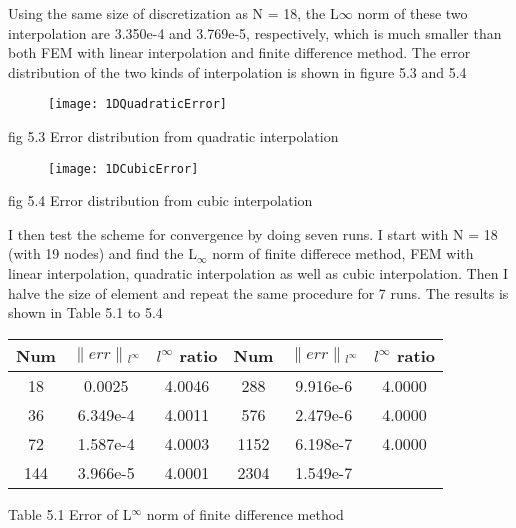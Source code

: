 \documentclass[journal]{IEEEtran}
\begin{document}
Using the same size of discretization as N = 18, the L$\infty$ norm of these two interpolation are 3.350e-4 and 3.769e-5, respectively, which is much smaller than both FEM with linear interpolation and finite difference method. The error distribution of the two kinds of interpolation is shown in figure 5.3 and 5.4
\begin{figure}[h]
	\centering
	\texttt{[image: 1DQuadraticError]}
\end{figure}
\begin{center}
	\small fig 5.3 Error distribution from quadratic interpolation
\end{center} 
\begin{figure}[h]
	\centering
	\texttt{[image: 1DCubicError]}
\end{figure}
\begin{center}
	\small fig 5.4 Error distribution from cubic interpolation
\end{center} 
I then test the scheme for convergence by doing seven runs. I start with N = 18 (with 19 nodes) and find the L$_\infty$ norm of finite differece method, FEM with linear interpolation, quadratic interpolation as well as cubic interpolation. Then I halve the size of element and repeat the same procedure for 7 runs. The results is shown in Table 5.1 to 5.4

\begin{center}
	\begin{tabular}{| c | c | c | c | c | c |}
		\hline
		Num	& $\lVert err \lVert$$_{l^\infty}$ & ${l^\infty}$ ratio&  Num	& $\lVert err \lVert$$_{l^\infty}$ & ${l^\infty}$ ratio \\ \hline
		18 & 0.0025 & 4.0046 & 288 & 9.916e-6 & 4.0000\\ \hline
		36 & 6.349e-4 & 4.0011 & 576 & 2.479e-6 & 4.0000 \\ \hline
		72 & 1.587e-4 & 4.0003 & 1152 & 6.198e-7 & 4.0000 \\ \hline
		144 & 3.966e-5 & 4.0001 & 2304 & 1.549e-7 &  \\ \hline
	\end{tabular}
\end{center}
\begin{center}
	\small Table 5.1 Error of L$^\infty$ norm  of finite difference method
\end{center}
\end{document}
